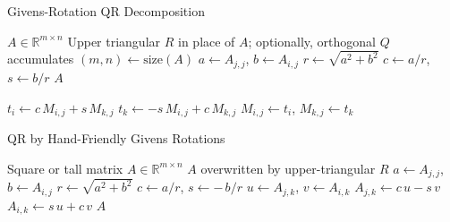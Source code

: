 \begin{algorithm}[H]
    \caption{Givens-Rotation QR Decomposition}
    \label{alg:givens-qr}
    \begin{algorithmic}[1]
        \Require $A\in\mathbb{R}^{m\times n}$
        \Ensure Upper triangular $R$ in place of $A$; optionally, orthogonal $Q$ accumulates
        \State $(m,n)\gets\text{size}(A)$
        \State $a\gets A_{j,j}$, $b\gets A_{i,j}$
        \State $r \gets \sqrt{a^2 + b^2}$
        \State $c \gets a / r$, $s \gets b / r$
        \State {}
        \EndIf
        \EndFor
        \EndFor
        \State \Return $A$ 
        \EndFunction

        \State $t_i \gets c\,M_{i,j} + s\,M_{k,j}$
        \State $t_k \gets -s\,M_{i,j} + c\,M_{k,j}$
        \State $M_{i,j}\gets t_i$, $M_{k,j}\gets t_k$
        \EndFor
        \EndFunction
    \end{algorithmic}
\end{algorithm}

\begin{algorithm}
    \caption{QR by Hand-Friendly Givens Rotations}
    \begin{algorithmic}[1]
        \Require Square or tall matrix $A\in\mathbb{R}^{m\times n}$ 
        \Ensure $A$ overwritten by upper-triangular $R$
                               
                      
        \State $a \gets A_{j,j}$,\; $b \gets A_{i,j}$       
                                             
        \State $r \gets \sqrt{a^2 + b^2}$                 
        \State $c \gets a/r$,\; $s \gets -\,b/r$          
                         
        \State $u \gets A_{j,k}$,\; $v \gets A_{i,k}$
        \State $A_{j,k} \gets c\,u - s\,v$
        \State $A_{i,k} \gets s\,u + c\,v$
        \EndFor
        \EndIf
        \EndFor
        \EndFor
        \Return $A$ 
    \end{algorithmic}
\end{algorithm}



